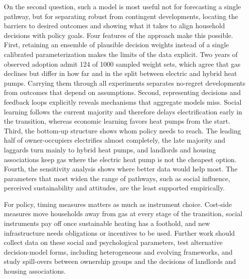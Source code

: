 \documentclass[preprint,12pt,authoryear]{elsarticle}
\begin{document}
On the second question, such a model is most useful not for forecasting a
single pathway, but for separating robust from contingent developments,
locating the barriers to desired outcomes and showing what it takes to align
household decisions with policy goals. Four features of the approach make
this possible. First, retaining an ensemble of plausible decision weights
instead of a single calibrated parameterization makes the limits of the data
explicit. Two years of observed adoption admit 124 of 1000 sampled weight
sets, which agree that gas declines but differ in how far and in the split
between electric and hybrid heat pumps. Carrying them through all experiments
separates no-regret developments from outcomes that depend on assumptions.
Second, representing decisions and feedback loops explicitly reveals
mechanisms that aggregate models miss. Social learning follows the current
majority and therefore delays electrification early in the transition,
whereas economic learning favors heat pumps from the start.
Third, the bottom-up structure shows whom
policy needs to reach. The leading half of owner-occupiers electrifies almost
completely, the late majority and laggards turn mainly to hybrid heat pumps,
and landlords and housing associations keep gas where the electric heat pump
is not the cheapest option. Fourth, the sensitivity analysis shows where
better data would help most. The parameters that most widen the range of
pathways, such as social influence, perceived sustainability and attitudes,
are the least supported empirically.

For policy, timing measures matters as much as instrument choice. Cost-side
measures move households away from gas at every stage of the transition,
social instruments pay off once sustainable heating has a foothold, and new
infrastructure needs obligations or incentives to be used. Further work
should collect data on these social and psychological parameters, test
alternative decision-model forms, including heterogeneous and evolving
frameworks, and study spill-overs between ownership groups and the decisions
of landlords and housing associations.



\end{document}

